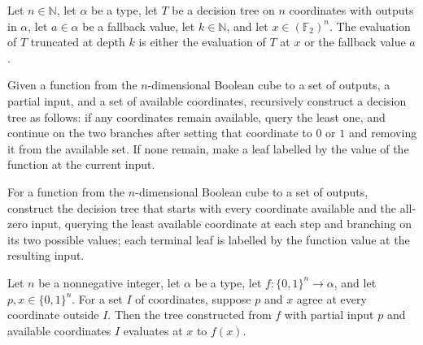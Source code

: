 \begin{theorem}
\leanok
{}
Let $n\in\mathbb{N}$, let $\alpha$ be a type, let $T$ be a decision tree on $n$
coordinates with outputs in $\alpha$, let $a\in\alpha$ be a fallback value, let
$k\in\mathbb{N}$, and let $x\in(\mathbb{F}_2)^n$. The evaluation of $T$ truncated at
depth $k$ is either the evaluation of $T$ at $x$ or the fallback value $a$.
\end{theorem}

\begin{definition}
\leanok
{}
Given a function from the $n$-dimensional Boolean cube to a set of outputs, a partial
input, and a set of available coordinates, recursively construct a decision tree as
follows: if any coordinates remain available, query the least one, and continue on the
two branches after setting that coordinate to $0$ or $1$ and removing it from the
available set. If none remain, make a leaf labelled by the value of the function at the
current input.
\end{definition}

\begin{definition}
\leanok
{}
For a function from the $n$-dimensional Boolean cube to a set of outputs, construct the
decision tree that starts with every coordinate available and the all-zero input,
querying the least available coordinate at each step and branching on its two possible
values; each terminal leaf is labelled by the function value at the resulting input.
\end{definition}

\begin{theorem}
\leanok
{}
Let $n$ be a nonnegative integer, let $\alpha$ be a type, let $f:\{0,1\}^n\to\alpha$,
and let $p,x\in\{0,1\}^n$. For a set $I$ of coordinates, suppose $p$ and $x$ agree at
every coordinate outside $I$. Then the tree constructed from $f$ with partial input $p$
and available coordinates $I$ evaluates at $x$ to $f(x)$.
\end{theorem}

